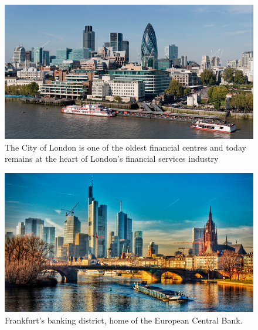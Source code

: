 \documentclass[international_finance_p1.tex]{subfiles}
\begin{document}
\begin{frame}
\begin{figure}
\centering
\fontsize{8pt}{8pt}\selectfont
\includegraphics[scale=0.5]{img/london}
\caption{The City of London is one of the oldest financial centres and today remains at the heart of London's financial services industry}
\end{figure}
\end{frame}
\begin{frame}
\begin{figure}
\centering
\includegraphics[scale=0.3]{img/frankfurt}
\caption{Frankfurt's banking district, home of the European Central Bank.}
\end{figure}
\end{frame}
\end{document}
